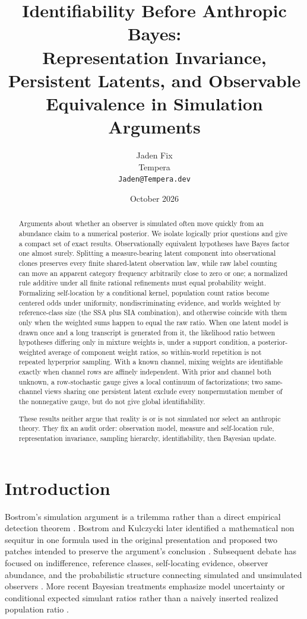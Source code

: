 \documentclass[11pt]{article}
\title{Identifiability Before Anthropic Bayes:\\Representation Invariance, Persistent Latents, and Observable Equivalence in Simulation Arguments}
\author{Jaden Fix\\Tempera\\\texttt{Jaden@Tempera.dev}}
\date{October 2026}
\begin{document}
\maketitle

\begin{abstract}
Arguments about whether an observer is simulated often move quickly from an abundance claim to a numerical posterior. We isolate logically prior questions and give a compact set of exact results. Observationally equivalent hypotheses have Bayes factor one almost surely. Splitting a measure-bearing latent component into observational clones preserves every finite shared-latent observation law, while raw label counting can move an apparent category frequency arbitrarily close to zero or one; a normalized rule additive under all finite rational refinements must equal probability weight. Formalizing self-location by a conditional kernel, population count ratios become centered odds under uniformity, nondiscriminating evidence, and worlds weighted by reference-class size (the SSA plus SIA combination), and otherwise coincide with them only when the weighted sums happen to equal the raw ratio. When one latent model is drawn once and a long transcript is generated from it, the likelihood ratio between hypotheses differing only in mixture weights is, under a support condition, a posterior-weighted average of component weight ratios, so within-world repetition is not repeated hyperprior sampling. With a known channel, mixing weights are identifiable exactly when channel rows are affinely independent. With prior and channel both unknown, a row-stochastic gauge gives a local continuum of factorizations; two same-channel views sharing one persistent latent exclude every nonpermutation member of the nonnegative gauge, but do not give global identifiability.

These results neither argue that reality is or is not simulated nor select an anthropic theory. They fix an audit order: observation model, measure and self-location rule, representation invariance, sampling hierarchy, identifiability, then Bayesian update.
\end{abstract}

\section{Introduction}
Bostrom's simulation argument is a trilemma rather than a direct empirical detection theorem \citep{bostrom2003}. Bostrom and Kulczycki later identified a mathematical non sequitur in one formula used in the original presentation and proposed two patches intended to preserve the argument's conclusion \citep{bostromkulczycki2011}. Subsequent debate has focused on indifference, reference classes, self-locating evidence, observer abundance, and the probabilistic structure connecting simulated and unsimulated observers \citep{weatherson2003,crawford2013,franceschi2014,richmond2017,fallislewis2023}. More recent Bayesian treatments emphasize model uncertainty or conditional expected simulant ratios rather than a naively inserted realized population ratio \citep{kipping2020,thomas2024}.
\end{document}
